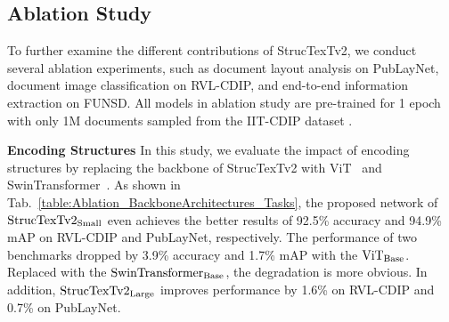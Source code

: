 \documentclass{article} %
\begin{document}
\subsection{Ablation Study}
To further examine the different contributions of StrucTexTv2, we conduct several ablation experiments, such as document layout analysis on PubLayNet, document image classification on RVL-CDIP, and end-to-end information extraction on FUNSD. All models in ablation study are pre-trained for 1 epoch with only 1M documents sampled from the IIT-CDIP dataset .

\begin{table}[ht]
\caption{The ablation study on pre-training tasks and different encoding structures.}
\label{table:Ablation_BackboneArchitectures_Tasks}
\vspace{-1em}
\begin{center}
\end{center}
\vspace{-0.5em}
\end{table}

\noindent\textbf{Encoding Structures} In this study, we evaluate the impact of encoding structures by replacing the backbone of StrucTexTv2 with ViT~\cite{DBLP:journals/corr/abs-2010-11929} and SwinTransformer~\cite{liu2021swin}. As shown in Tab.~\ref{table:Ablation_BackboneArchitectures_Tasks}, the proposed network of $\rm StrucTexTv2_{Small}$ even achieves the better results of 92.5\% accuracy and 94.9\% mAP on RVL-CDIP and PubLayNet, respectively. The performance of two benchmarks dropped by 3.9\% accuracy and 1.7\% mAP with the $\rm ViT_{Base}$. Replaced with the $\rm SwinTransformer_{Base}$, the degradation is more obvious. In addition, $\rm StrucTexTv2_{Large}$ improves performance by 1.6\% on RVL-CDIP and 0.7\% on PubLayNet.
\end{document}
